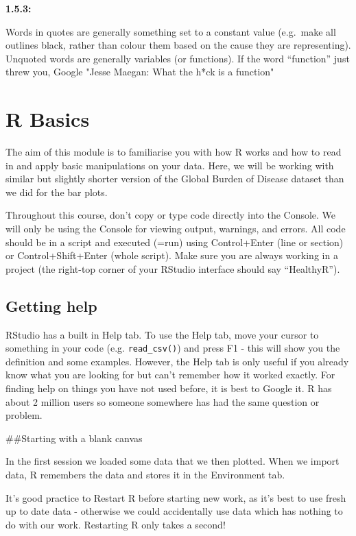 \documentclass[]{book}
\theoremstyle{definition}
\theoremstyle{definition}
\theoremstyle{definition}
\theoremstyle{remark}
\begin{document}
\textbf{1.5.3:}

Words in quotes are generally something set to a constant value
(e.g.~make all outlines black, rather than colour them based on the
cause they are representing). Unquoted words are generally variables (or
functions). If the word ``function'' just threw you, Google "Jesse
Maegan: What the h*ck is a function"

\hypertarget{r-basics}{%
\chapter{R Basics}\label{r-basics}}

The aim of this module is to familiarise you with how R works and how to
read in and apply basic manipulations on your data. Here, we will be
working with similar but slightly shorter version of the Global Burden
of Disease dataset than we did for the bar plots.

Throughout this course, don't copy or type code directly into the
Console. We will only be using the Console for viewing output, warnings,
and errors. All code should be in a script and executed (=run) using
Control+Enter (line or section) or Control+Shift+Enter (whole script).
Make sure you are always working in a project (the right-top corner of
your RStudio interface should say ``HealthyR'').

\hypertarget{getting-help}{%
\section{Getting help}\label{getting-help}}

RStudio has a built in Help tab. To use the Help tab, move your cursor
to something in your code (e.g. \texttt{read\_csv()}) and press F1 -
this will show you the definition and some examples. However, the Help
tab is only useful if you already know what you are looking for but
can't remember how it worked exactly. For finding help on things you
have not used before, it is best to Google it. R has about 2 million
users so someone somewhere has had the same question or problem.

\#\#Starting with a blank canvas

In the first session we loaded some data that we then plotted. When we
import data, R remembers the data and stores it in the Environment tab.

It's good practice to Restart R before starting new work, as it's best
to use fresh up to date data - otherwise we could accidentally use data
which has nothing to do with our work. Restarting R only takes a second!
\end{document}
